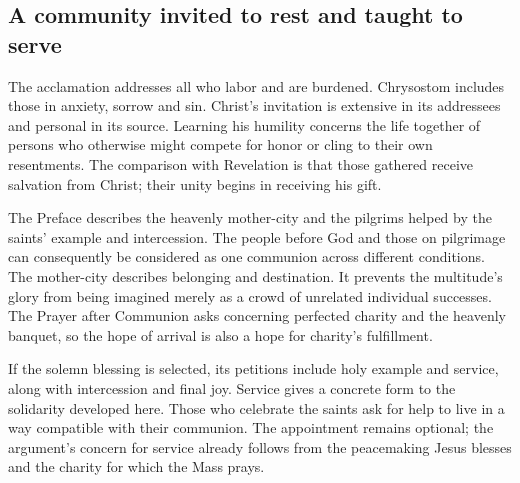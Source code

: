\subsection{A community invited to rest and taught to serve}
The acclamation addresses all who labor and are burdened. Chrysostom includes those in anxiety, sorrow and sin. Christ's invitation is extensive in its addressees and personal in its source. Learning his humility concerns the life together of persons who otherwise might compete for honor or cling to their own resentments. The comparison with Revelation is that those gathered receive salvation from Christ; their unity begins in receiving his gift.

The Preface describes the heavenly mother-city and the pilgrims helped by the saints' example and intercession. The people before God and those on pilgrimage can consequently be considered as one communion across different conditions. The mother-city describes belonging and destination. It prevents the multitude's glory from being imagined merely as a crowd of unrelated individual successes. The Prayer after Communion asks concerning perfected charity and the heavenly banquet, so the hope of arrival is also a hope for charity's fulfillment.

If the solemn blessing is selected, its petitions include holy example and service, along with intercession and final joy. Service gives a concrete form to the solidarity developed here. Those who celebrate the saints ask for help to live in a way compatible with their communion. The appointment remains optional; the argument's concern for service already follows from the peacemaking Jesus blesses and the charity for which the Mass prays.

